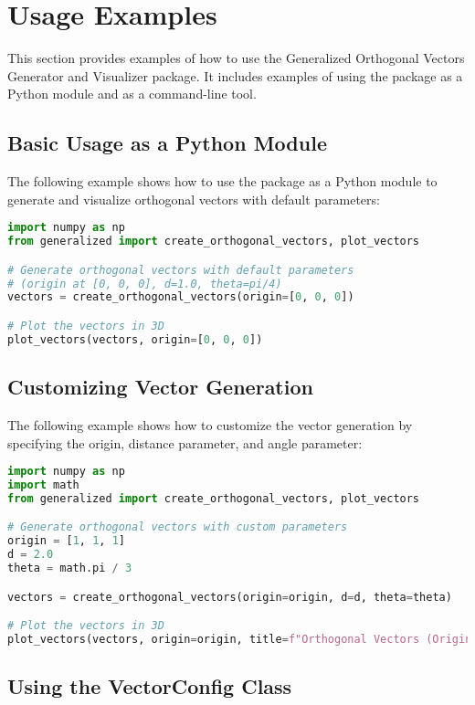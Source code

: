 \section{Usage Examples}

This section provides examples of how to use the Generalized Orthogonal Vectors Generator and Visualizer package. It includes examples of using the package as a Python module and as a command-line tool.

\subsection{Basic Usage as a Python Module}

The following example shows how to use the package as a Python module to generate and visualize orthogonal vectors with default parameters:

\begin{lstlisting}[language=Python]
import numpy as np
from generalized import create_orthogonal_vectors, plot_vectors

# Generate orthogonal vectors with default parameters
# (origin at [0, 0, 0], d=1.0, theta=pi/4)
vectors = create_orthogonal_vectors(origin=[0, 0, 0])

# Plot the vectors in 3D
plot_vectors(vectors, origin=[0, 0, 0])
\end{lstlisting}

\subsection{Customizing Vector Generation}

The following example shows how to customize the vector generation by specifying the origin, distance parameter, and angle parameter:

\begin{lstlisting}[language=Python]
import numpy as np
import math
from generalized import create_orthogonal_vectors, plot_vectors

# Generate orthogonal vectors with custom parameters
origin = [1, 1, 1]
d = 2.0
theta = math.pi / 3

vectors = create_orthogonal_vectors(origin=origin, d=d, theta=theta)

# Plot the vectors in 3D
plot_vectors(vectors, origin=origin, title=f"Orthogonal Vectors (Origin={origin}, d={d}, theta={theta})")
\end{lstlisting}

\subsection{Using the VectorConfig Class}

